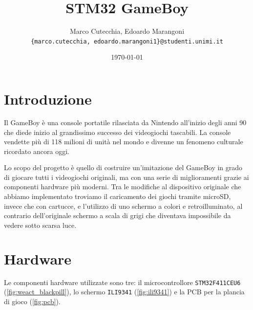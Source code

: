 \documentclass[hidelinks,12pt]{article}
\title{STM32 GameBoy}
\date{\today}
\author{Marco Cutecchia, Edoardo Marangoni \\
\footnotesize \texttt{\{marco.cutecchia, edoardo.marangoni1\}@studenti.unimi.it} \\ }
\begin{document}
\maketitle

\section{Introduzione}
Il GameBoy è una console portatile rilasciata da Nintendo all'inizio degli anni
90 che diede inizio al grandissimo successo dei videogiochi tascabili.
La console vendette più di 118 milioni di unità nel mondo e divenne un fenomeno
culturale ricordato ancora oggi.

Lo scopo del progetto è quello di costruire un'imitazione del GameBoy in grado
di giocare tutti i videogiochi originali, ma con una serie di miglioramenti
grazie ai componenti hardware più moderni. Tra le modifiche al dispositivo
originale che abbiamo implementato troviamo il caricamento dei giochi tramite
microSD, invece che con cartucce, e l'utilizzo di uno schermo a colori e
retroilluminato, al contrario dell'originale schermo a scala di grigi che
diventava impossibile da vedere sotto scarsa luce.

\section{Hardware}
Le componenti hardware utilizzate sono tre: il microcontrollore
\texttt{STM32F411CEU6} (\cref{fig:weact_blackpill}), lo schermo \texttt{ILI9341}
(\cref{fig:ili9341}) e la PCB per la plancia di gioco
(\cref{fig:pcb}).
\end{document}
